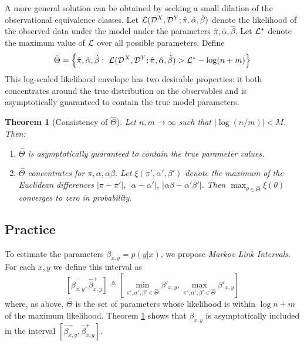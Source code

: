 \documentclass{article}
\newtheorem{thm}{Theorem}
\theoremstyle{definition}
\begin{document}
A more general solution can be obtained by seeking a small dilation of the observational equivalence classes.  Let $\mathcal{L}(\mathcal{D}^X,\mathcal{D}^Y;\hat \pi,\hat \alpha,\hat \beta)$ denote the likelihood of the observed data under the model under the parameters $\hat \pi,\hat \alpha,\hat \beta$.  Let $\mathcal{L}^*$ denote the maximum value of $\mathcal{L}$ over all possible parameters.  Define
\begin{gather}
\hat \Theta=\left\{\hat \pi, \hat \alpha,\hat \beta:\ \mathcal{L}(\mathcal{D}^X,\mathcal{D}^Y;\hat \pi,\hat \alpha,\hat \beta) > \mathcal{L}^* - \log(n+m)\right\} \label{eq:magictheta}
\end{gather}
This log-scaled likelihood envelope has two desirable properties: it both concentrates around the true distribution on the observables and is asymptotically guaranteed to contain the true model parameters.
\begin{thm}[Consistency of $\hat \Theta$]\label{thm:consistency} Let $n,m\rightarrow\infty$ such that $|\log(n/m)|<M$.  Then:
\begin{enumerate}
    \item $\hat \Theta$ is asymptotically guaranteed to contain the true parameter values.  
    \item $\hat \Theta$ concentrates for $\pi,\alpha,\alpha\beta$. Let $\xi(\pi',\alpha',\beta')$ denote the maximum of the Euclidean differences $|\pi-\pi'|$, $|\alpha-\alpha'|$, $|\alpha\beta-\alpha'\beta'|$.  Then $\max_{\theta \in \hat \Theta} \xi(\theta)$ converges to zero in probability.   
\end{enumerate}
\end{thm}

\subsection{Practice}


\label{sec:mlidef}

To estimate the parameters $\beta_{x,y} = p(y|x)$, we propose \emph{Markov Link Intervals}.  For each $x,y$ we define this interval as 
\[
[\hat \beta^-_{x,y},\hat \beta^+_{x,y}] \triangleq \left[\min_{\pi',\alpha',\beta' \in \hat \Theta} \beta'_{x,y},\max_{\pi',\alpha',\beta' \in \hat \Theta}\beta'_{x,y}\right]
\]  
where, as above, $\hat \Theta$ is the set of parameters whose likelihood is within $\log n+m$ of the maximum likelihood.  Theorem \ref{thm:consistency} shows that $\beta_{x,y}$ is asymptotically included in the interval $[\hat \beta^-_{x,y},\hat \beta^+_{x,y}]$.  
\end{document}
